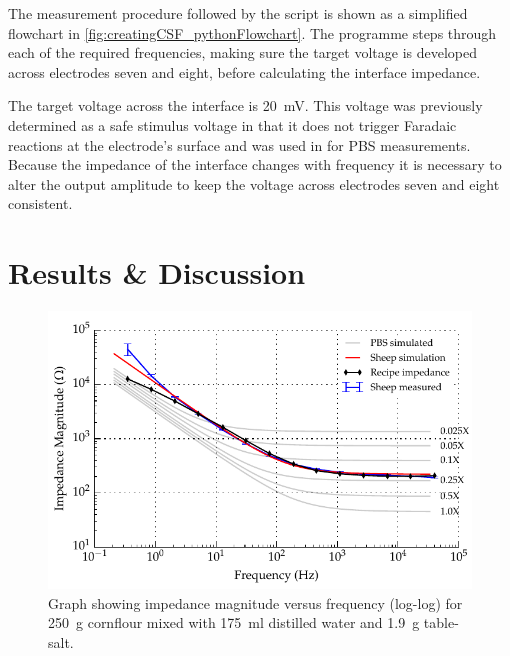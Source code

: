   The measurement procedure followed by the script is shown as a simplified flowchart in \cref{fig:creatingCSF_pythonFlowchart}.
  The programme steps through each of the required frequencies, making sure the target voltage is developed across electrodes seven and eight, before calculating the interface impedance.

  The target voltage across the interface is \SI{20}{\milli\volt}.
  This voltage was previously determined as a safe stimulus voltage in that it does not trigger Faradaic reactions at the electrode's surface and was used in for PBS measurements.
  Because the impedance of the interface changes with frequency it is necessary to alter the output amplitude to keep the voltage across electrodes seven and eight consistent.


\section{Results \& Discussion}

  \begin{figure}
    \centering
    \includegraphics[width=\textwidth]{content/pt2/graphics/run14_175ml-distilledWater_250g-cornflour_1g9-salt_ZVsF_graph_mag}
    \caption{\label{fig:recipe_cornflour_salt_mag}Graph showing impedance magnitude versus frequency (log-log) for \SI{250}{\gram} cornflour mixed with \SI{175}{\milli\litre} distilled water and \SI{1.9}{\gram} table-salt.}
  \end{figure}

